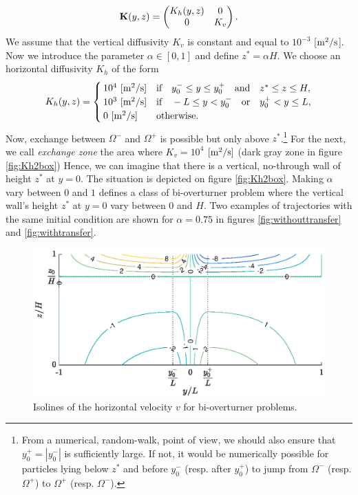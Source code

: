  \begin{equation}
 	\b K(y,z) = \begin{pmatrix} K_h(y,z) & 0\\ 0 & K_v \end{pmatrix}.  	
 \end{equation} 
We assume that the vertical diffusivity $K_v$ is constant and equal to $10^{-3}$ [$\rm{m^2/s}$]. Now we introduce the parameter $\alpha \in [0,1]$ and define $z^* = \alpha H$. We choose an horizontal diffusivity $K_h$ of the form
\begin{equation} \label{eq:Kh2box}
	K_h(y,z) = \begin{cases}
			10^4\ \rm{[m^2/s]} & \mbox{if} \quad y_0^- \le y \le y_0^+ \quad \mbox{and} \quad z^* \le z \le H,\\
			10^3\ \rm{[m^2/s]} & \mbox{if} \quad -L \le y < y_0^- \quad \mbox{or} \quad y_0^+ < y \le L,\\
			0\ \rm{[m^2/s]}  & \mbox{otherwise}.
		\end{cases}
\end{equation}
Now, exchange between $\Omega^-$ and $\Omega^+$ is possible but only above $z^*$.\footnote{From a numerical, random-walk, point of view, we should also ensure that $y_0^+ = |y_0^-|$ is sufficiently large. If not, it would be numerically possible for particles lying below $z^*$ and before $y_0^-$ (resp. after $y_0^+$) to jump from $\Omega^-$ (resp. $\Omega^+$) to $\Omega^+$ (resp. $\Omega^-$).} For the next, we call \textit{exchange zone} the area where $K_v = 10^4$ $\rm{[m^2/s]}$ (dark gray zone in figure \ref{fig:Kh2box}) Hence, we can imagine that there is a vertical, no-through wall of height $z^*$ at $y=0$. The situation is depicted on figure \ref{fig:Kh2box}. Making $\alpha$ vary between $0$ and $1$ defines a class of bi-overturner problem where the vertical wall's height $z^*$ at $y=0$ vary between $0$ and $H$. Two examples of trajectories with the same initial condition are shown for $\alpha = 0.75$ in figures \ref{fig:withouttransfer} and \ref{fig:withtransfer}.

\begin{figure}[!htp]
	\centering
	\includegraphics[width=\textwidth]{fig/problem2box/v2box_timmermans.eps}
	\caption{Isolines of the horizontal velocity $v$ for bi-overturner problems.}
	\label{fig:v2box}
\end{figure}

